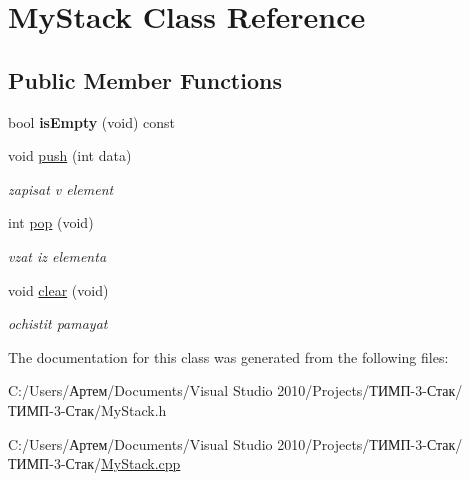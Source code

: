 \hypertarget{class_my_stack}{}\section{My\+Stack Class Reference}
\label{class_my_stack}
\subsection*{Public Member Functions}
\begin{DoxyCompactItemize}
\item 
\hypertarget{class_my_stack_a6cefeda74be6251847089472cff4ece2}{}bool {\bfseries is\+Empty} (void) const \label{class_my_stack_a6cefeda74be6251847089472cff4ece2}

\item 
\hypertarget{class_my_stack_ae43d27e5e09cb3aef4ac075ec993296a}{}void \hyperlink{class_my_stack_ae43d27e5e09cb3aef4ac075ec993296a}{push} (int data)\label{class_my_stack_ae43d27e5e09cb3aef4ac075ec993296a}

\begin{DoxyCompactList}\small\item\em zapisat\textquotesingle{} v element \end{DoxyCompactList}\item 
\hypertarget{class_my_stack_a69d56442c3fc4f4ddd3923375b297d26}{}int \hyperlink{class_my_stack_a69d56442c3fc4f4ddd3923375b297d26}{pop} (void)\label{class_my_stack_a69d56442c3fc4f4ddd3923375b297d26}

\begin{DoxyCompactList}\small\item\em vzat\textquotesingle{} iz elementa \end{DoxyCompactList}\item 
\hypertarget{class_my_stack_ad8100da996e9d1cabba6db9aad81d1a1}{}void \hyperlink{class_my_stack_ad8100da996e9d1cabba6db9aad81d1a1}{clear} (void)\label{class_my_stack_ad8100da996e9d1cabba6db9aad81d1a1}

\begin{DoxyCompactList}\small\item\em ochistit\textquotesingle{} pamayat\textquotesingle{} \end{DoxyCompactList}\end{DoxyCompactItemize}


The documentation for this class was generated from the following files\+:\begin{DoxyCompactItemize}
\item 
C\+:/\+Users/Артем/\+Documents/\+Visual Studio 2010/\+Projects/ТИМП-\/3-\/Стак/ТИМП-\/3-\/Стак/My\+Stack.\+h\item 
C\+:/\+Users/Артем/\+Documents/\+Visual Studio 2010/\+Projects/ТИМП-\/3-\/Стак/ТИМП-\/3-\/Стак/\hyperlink{_my_stack_8cpp}{My\+Stack.\+cpp}\end{DoxyCompactItemize}
